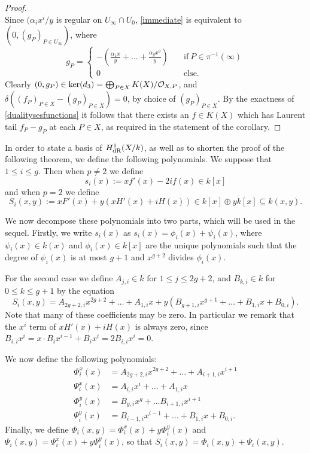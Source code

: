 \begin{proof}
\begin{equation}
        \end{equation}
    Since $(\alpha_ix^i/y$ is regular on $U_\infty \cap U_0$, \eqref{immediate} is equivalent to $\left(0, (g_P)_{P \in U_\infty}\right)$, where
        \[
        g_P =
            \begin{cases}
            - \left( \frac{\alpha_1 x}{y} + \ldots + \frac{\alpha_g x^g}{y}\right) & \quad \text{if}\ P \in \pi^{-1}(\infty) \\
            0 & \quad \text{else.}
            \end{cases}
        \]
    Clearly $(0, g_P) \in \ker (d_3) = \bigoplus_{P \in X} K(X)/{\cal O}_{X,P}$, and $\delta((f_P)_{P \in X} - (g_P)_{P \in X}) = 0$, by choice of $(g_P)_{P \in X}$.
    By the exactness of \eqref{dualitysesfunctions} it follows that there exists an $f \in K(X)$ which has Laurent tail $f_P - g_P$ at each $P \in X$, as required in the statement of the corollary.
    \end{proof}


In order to state a basis of $H_{\text {dR}}^1(X/k)$, as well as to shorten the proof of the following theorem, we define the following polynomials. 
We suppose that $1 \leq i \leq g$.
Then when $p\neq 2$ we define
    \[
    s_i(x) := xf'(x) - 2if(x) \in k[x]
    \]
and when $p = 2$ we define
    \begin{equation}\label{capitals}
    S_i(x,y) := xF'(x) + y(xH'(x) + iH(x))\in k[x]\oplus yk[x] \subseteq k(x,y).
    \end{equation}

We now decompose these polynomials into two parts, which will be used in the sequel.
Firstly, we write $s_i(x)$ as $s_i(x) = \phi_i(x) + \psi_i(x)$, where $\psi_i(x)\in k(x)$ and $\phi_i(x) \in k[x]$ are the unique polynomials such that the degree of $\psi_i (x)$ is at most $g+1$ and $x^{g+2}$ divides $\phi_i(x)$.

For the second case we define $A_{j,i} \in k$ for $1 \leq j \leq 2g+2$, and $B_{k,i} \in k$ for $0\leq k \leq g+1$ by the equation
    \[
    S_i(x,y) = A_{2g+2,i}x^{2g+2} + \ldots + A_{1,i} x + y(B_{g+1,i} x^{g+1} + \ldots + B_{1,i} x + B_{0,i}).
    \]
Note that many of these coefficients may be zero.
In particular we remark that the $x^i$ term of $xH'(x) + iH(x)$ is always zero, since $B_{i,i}x^i = x \cdot B_ix^{i-1} + B_i x^i = 2B_{i,i}x^i = 0$.


We now define the following polynomials:
    \begin{equation}\label{Split}
    \begin{split}
    \Phi_i^x(x) & =  A_{2g+2, i}x^{2g+2} + \ldots + A_{i+1, i}x^{i+1} \\
    \Psi_i^x(x) & =  A_{i,i}x^i + \ldots + A_{1,i}x \\
    \Phi_i^y(x) & =  B_{g,i}x^g + \ldots B_{i+1,i}x^{i+1} \\
    \Psi_i^y(x) & =  B_{i-1,i}x^{i-1} + \ldots + B_{1,i}x + B_{0,i}.
    \end{split}
    \end{equation}
Finally, we define $\Phi_i(x,y) = \Phi_i^x(x) + y \Phi^y_i(x)$ and $\Psi_i(x,y) = \Psi_i^x(x) + y \Psi_i^y(x)$, so that $S_i(x,y) = \Phi_i(x,y) + \Psi_i(x,y)$.

